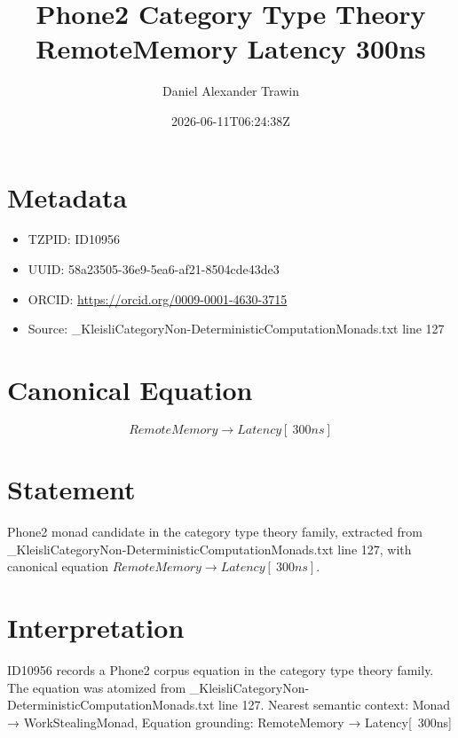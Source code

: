 \documentclass[11pt]{article}
\title{Phone2 Category Type Theory RemoteMemory Latency 300ns}
\author{Daniel Alexander Trawin}
\date{2026-06-11T06:24:38Z}
\begin{document}
\maketitle
\section*{Metadata}
\begin{itemize}
\item TZPID: ID10956
\item UUID: 58a23505-36e9-5ea6-af21-8504cde43de3
\item ORCID: \url{https://orcid.org/0009-0001-4630-3715}
\item Source: _KleisliCategoryNon-DeterministicComputationMonads.txt line 127
\end{itemize}
\section*{Canonical Equation}
\[
RemoteMemory → Latency[~300ns]
\]
\section*{Statement}
Phone2 monad candidate in the category type theory family, extracted from _KleisliCategoryNon-DeterministicComputationMonads.txt line 127, with canonical equation $RemoteMemory → Latency[~300ns]$.
\section*{Interpretation}
ID10956 records a Phone2 corpus equation in the category type theory family. The equation was atomized from _KleisliCategoryNon-DeterministicComputationMonads.txt line 127. Nearest semantic context: Monad → WorkStealingMonad, Equation grounding: RemoteMemory → Latency[~300ns]
\end{document}
